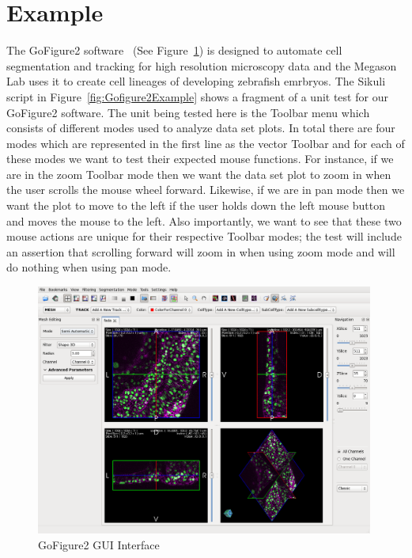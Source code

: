 \documentclass{InsightArticle}
\begin{document}
\section{Example}
\label{sec:GoFigure2Example}

The GoFigure2 software~\cite{GoFigure2:Website} (See
Figure~\ref{fig:GoFigure2GUI}) is designed to automate
cell segmentation and tracking for high resolution microscopy data and the
Megason Lab uses it to create cell lineages of developing zebrafish emrbryos.
The Sikuli script in Figure~\ref{fig:Gofigure2Example} shows a fragment of a
unit test for our GoFigure2 software. The unit being tested here is the Toolbar
menu which consists of different modes used to analyze data set plots. In total
there are four modes which are represented in the first line as the vector
Toolbar and for each of these modes we want to test their expected
mouse functions. For instance, if we are in the zoom Toolbar mode then we want
the data set plot to zoom in when the user scrolls the mouse wheel
forward. Likewise, if we are in pan mode then we want the plot to move to the
left if the user holds down the left mouse button and moves the mouse to
the left. Also importantly, we want to see that these two mouse actions are
unique for their respective Toolbar modes; the test will include an assertion
that scrolling forward will zoom in when using zoom mode and will do nothing
when using pan mode.\\

\begin{figure}[tbp]
 \centering
 \includegraphics[width=0.99\textwidth]{Images/Gofigure2GUI.png}
 \caption{GoFigure2 GUI Interface}
 \label{fig:GoFigure2GUI}
\end{figure}
\end{document}
